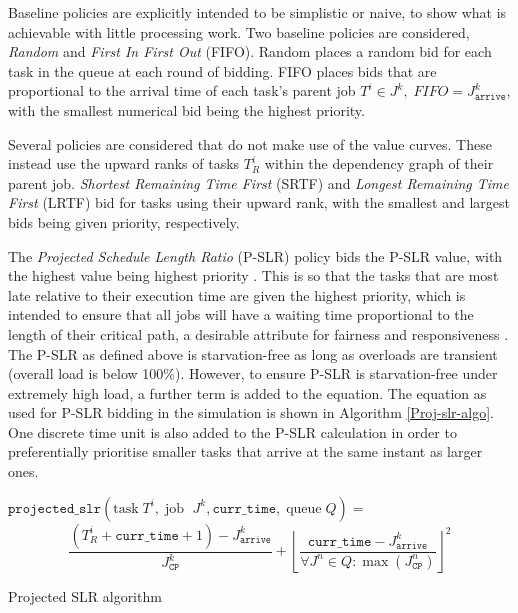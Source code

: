 \documentclass[english,british]{IEEEtran}
\begin{document}
Baseline policies are explicitly intended to be simplistic or naive,
to show what is achievable with little processing work. Two baseline
policies are considered, \emph{Random} and \emph{First In First Out}
(FIFO). Random places a random bid for each task in the queue at each
round of bidding. FIFO places bids that are proportional to the arrival
time of each task's parent job $T^{i}\in J^{k},\;FIFO=J_{\mathtt{arrive}}^{k}$,
with the smallest numerical bid being the highest priority.

Several policies are considered that do not make use of the value
curves. These instead use the upward ranks of tasks $T_{R}^{i}$ within
the dependency graph of their parent job. \emph{Shortest Remaining
Time First} (SRTF) and \emph{Longest Remaining Time First} (LRTF)
\cite{zhaosakellariou06,Topcuoglu2002} bid for tasks using their
upward rank, with the smallest and largest bids being given priority,
respectively.

The \emph{Projected Schedule Length Ratio} (P-SLR) policy bids the
P-SLR value, with the highest value being highest priority \cite{burkimsher12}.
This is so that the tasks that are most late relative to their execution
time are given the highest priority, which is intended to ensure that
all jobs will have a waiting time proportional to the length of their
critical path, a desirable attribute for fairness and responsiveness
\cite{saule10}. The P-SLR as defined above is starvation-free as
long as overloads are transient (overall load is below 100\%). However,
to ensure P-SLR is starvation-free under extremely high load, a further
term is added to the equation. The equation as used for P-SLR bidding
in the simulation is shown in Algorithm \ref{Proj-slr-algo}. One
discrete time unit is also added to the P-SLR calculation in order
to preferentially prioritise smaller tasks that arrive at the same
instant as larger ones.

\begin{algorithm}
$\mathtt{projected\_slr}(\textrm{task}\;T^{i},\;\textrm{job\ }\;J^{k},\mathtt{curr\_time},\;\textrm{queue}\;Q)=$
\[
\frac{\left(T_{R}^{i}+\mathtt{curr\_time}+1\right)-J_{\mathtt{arrive}}^{k}}{J_{\mathtt{CP}}^{k}}+\left\lfloor \frac{\mathtt{curr\_time}-J_{\mathtt{arrive}}^{k}}{\forall J^{n}\in Q:\max\left(J_{\mathtt{CP}}^{n}\right)}\right\rfloor ^{2}
\]


\protect\caption{Projected SLR algorithm}
\label{Proj-slr-algo}
\end{algorithm}
\end{document}
